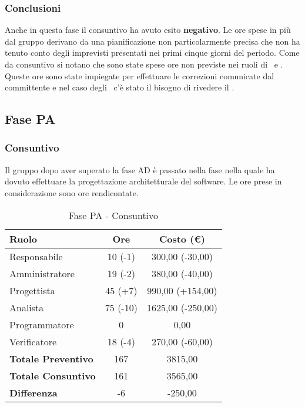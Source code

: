 \documentclass[../PianoProgetto.tex]{subfiles}
\begin{document}
	\subsubsection{Conclusioni}	
     Anche in questa fase il consuntivo ha avuto esito \textbf{negativo}.
     Le ore spese in più dal gruppo derivano da una pianificazione non particolarmente precisa che non ha tenuto conto degli imprevisti presentati nei primi cinque giorni del periodo.
     Come da consuntivo si notano che sono state spese ore non previste nei ruoli di \amministratore\ e \analista. Queste ore sono state impiegate per effettuare le correzioni comunicate dal committente e nel caso degli \amministratori\ c'è stato il bisogno di rivedere il \pianodiqualifica. 
	
    \subsection{Fase PA}
	\subsubsection{Consuntivo}
	Il gruppo dopo aver superato la fase AD è passato nella fase nella quale ha dovuto effettuare la progettazione architetturale del software\g. Le ore prese in considerazione sono ore rendicontate. 
	
	\begin{table}[h]
		\centering
		\begin{tabular}{l * {2}{c}}
			\toprule
			\textbf{Ruolo} & \textbf{Ore} & \textbf{Costo (\euro{})} \\
			\midrule
			Responsabile &		10 (-1) & 300,00  (-30,00) \\
			Amministratore &	19 (-2) & 380,00  (-40,00) \\
			Progettista & 		45 (+7) & 990,00  (+154,00)\\
			Analista & 			75	(-10)	& 1625,00   (-250,00)       \\
			Programmatore & 	0		& 0,00 				\\
			Verificatore & 		18 (-4) & 270,00 (-60,00)	\\
			\midrule
			\textbf{Totale Preventivo} & 167
			& 3815,00
			\\		
			\textbf{Totale Consuntivo} & 161 & 3565,00 
			\\
			\midrule
			\textbf{Differenza} & -6 & -250,00 \\
			\bottomrule
		\end{tabular}
		
		\caption{Fase PA - Consuntivo}
		\label{tab:consuntivoPA}
		
	\end{table}		
	
\end{document}
